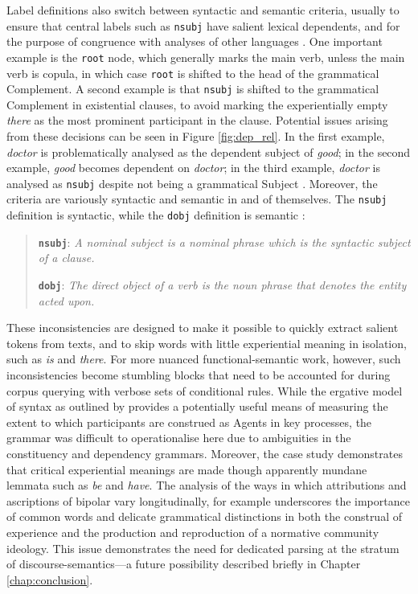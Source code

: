 Label definitions also switch between syntactic and semantic criteria, usually to ensure that central labels such as \texttt{nsubj} have salient lexical dependents, and for the purpose of congruence with analyses of other languages \cite{marneffe_ud_2014}. One important example is the \texttt{root} node, which generally marks the main verb, unless the main verb is copula, in which case \texttt{root} is shifted to the head of the grammatical Complement. A second example is that \texttt{nsubj} is shifted to the grammatical Complement in existential clauses, to avoid marking the experientially empty \emph{there} \cite{halliday_introduction_2004} as the most prominent participant in the clause. Potential issues arising from these decisions can be seen in Figure \ref{fig:dep_rel}. In the first example, \emph{doctor} is problematically analysed as the dependent subject of \emph{good}; in the second example, \emph{good} becomes dependent on \emph{doctor}; in the third example, \emph{doctor} is analysed as \texttt{nsubj} despite not being a grammatical Subject \cite{marneffe_ud_2014}. Moreover, the criteria are variously syntactic and semantic in and of themselves. The \texttt{nsubj} definition is syntactic, while the \texttt{dobj} definition is semantic \cite[see][]{nivre_towards_2015}:

\begin{quotation}\small \singlespacing
\textbf{\texttt{nsubj}}: \emph{A nominal subject is a nominal phrase which is the syntactic subject of a clause.}

\textbf{\texttt{dobj}}: \emph{The direct object of a verb is the noun phrase that denotes the entity acted upon.}
\end{quotation}
%
These inconsistencies are designed to make it possible to quickly extract salient tokens from texts, and to skip words with little experiential meaning in isolation, such as \emph{is} and \emph{there}. For more nuanced functional\hyp{}semantic work, however, such inconsistencies become stumbling blocks that need to be accounted for during corpus querying with verbose sets of conditional rules. While the ergative model of syntax as outlined by \textcite{halliday_introduction_2004} provides a potentially useful means of measuring the extent to which participants are construed as Agents in key processes, the grammar was difficult to operationalise here due to ambiguities in the constituency and dependency grammars. Moreover, the case study demonstrates that critical experiential meanings are made though apparently mundane lemmata such as \emph{be} and \emph{have}. The analysis of the ways in which attributions and ascriptions of \gls{bipolar} vary longitudinally, for example underscores the importance of common words and delicate grammatical distinctions in both the construal of experience and the production and reproduction of a normative community ideology. This issue demonstrates the need for dedicated parsing at the stratum of \glspl{discourse-semantic}---a future possibility described briefly in Chapter \ref{chap:conclusion}.

